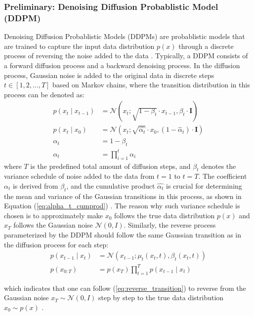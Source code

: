 \documentclass[final-report]{article-template}
\begin{document}
\subsubsection{Preliminary: Denoising Diffusion Probablistic Model (DDPM)}
Denoising Diffusion Probablistic Models (DDPMs) are probablistic models that are trained to capture the input data distribution $p(x)$ through a discrete process of reversing the noise added to the data \cite{yang2024survey, ho2006diff}. Typically, a DDPM consists of a forward diffusion process and a backward denoising process. In the diffusion process, Gaussian noise is added to the original data in discrete steps $t \in [1, 2, \dots, T]$ based on Markov chains, where the transition distribution in this process can be denoted as:
\begin{align}
    p\left(x_t \mid x_{t-1}\right) &= \mathcal{N}\left(x_t ; \sqrt{1-\beta_t} \cdot x_{t-1}, \beta_t \cdot \mathbf{I}\right) \nonumber\\
    p\left(x_t \mid x_0\right) &= \mathcal{N}\left(x_t ; \sqrt{\hat{\alpha_t}} \cdot x_0,\left(1-\hat{\alpha}_t\right) \cdot \mathbf{I}\right) \label{eq:alpha_t_cumprod}\\
    \alpha_t &= 1 - \beta_t \nonumber\\
    \hat{\alpha}_t &= \prod_{i=1}^{t} \alpha_i
\end{align}
where $T$ is the predefined total amount of diffusion steps, and $\beta_t$ denotes the variance schedule of noise added to the data from $t=1$ to $t=T$. The coefficient $\alpha_t$ is derived from $\beta_t$, and the cumulative product $\hat{\alpha_t}$ is crucial for determining the mean and variance of the Gaussian transitions in this process, as shown in Equation (\ref{eq:alpha_t_cumprod}) \cite{gao2024prediff}. The reason why such variance schedule is chosen is to approximately make $x_0$ follows the true data distribution $p(x)$ and $x_T$ follows the Gaussian noise $\mathcal{N}(0, I)$. Similarly, the reverse process parameterized by the DDPM should follow the same Gaussian transition as in the diffusion process for each step:
\begin{align}
    p\left(x_{t-1} \mid x_{t}\right) &= \mathcal{N}\left(x_{t-1} ;\mu_t(x_t, t), \beta_t(x_t, t)\right) \label{eq:reverse_transition} \\
    p\left(x_{0: T}\right) &= p\left(x_T\right) \prod_{t=1}^T p\left(x_{t-1} \mid x_t\right)
    \label{eq:cumprod_reverse}
\end{align}

which indicates that one can follow (\ref{eq:reverse_transition}) to reverse from the Gaussian noise $x_T \sim \mathcal{N}(0, I)$ step by step to the true data distribution $x_0 \sim p(x)$ \cite{ho2006diff}. \\
\end{document}
